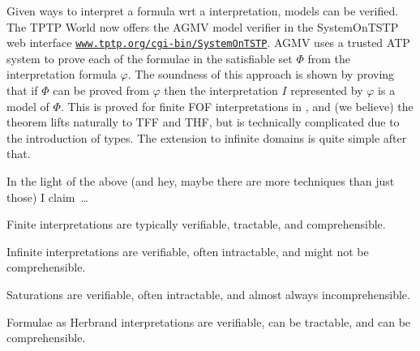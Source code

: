 \documentclass{easychair}
\newenvironment{packed_itemize}{
\vspace*{-0.2em}
\begin{itemize}
\setlength{\partopsep}{0pt}
\setlength{\itemsep}{1pt}
\setlength{\parskip}{0pt}
\setlength{\parsep}{0pt}
}{\end{itemize}}
\begin{document}
Given ways to interpret a formula wrt a interpretation, models can be verified.
The TPTP World now offers the AGMV model verifier in the SystemOnTSTP \cite{Sut07-CSR} web 
interface \href{https://www.tptp.org/cgi-bin/SystemOnTSTP}{{\tt www.tptp.org/cgi-bin/SystemOnTSTP}}.
AGMV uses a trusted ATP system to prove each of the formulae in the satisfiable set $\Phi$
from the interpretation formula $\varphi$.
The soundness of this approach is shown by proving that if $\Phi$ can be proved from $\varphi$ 
then the interpretation $I$ represented by $\varphi$ is a model of $\Phi$.
This is proved for finite FOF interpretations in \cite{SS+23-LPAR}, and (we believe) the theorem 
lifts naturally to TFF and THF, but is technically complicated due to the introduction of types.
The extension to infinite domains is quite simple after that.

In the light of the above (and hey, maybe there are more techniques than just those) I claim~\ldots
\begin{packed_itemize}
\item Finite interpretations are typically verifiable, tractable, and comprehensible.
\item Infinite interpretations are verifiable, often intractable, and might not be 
      comprehensible.
\item Saturations are verifiable, often intractable, and almost always incomprehensible.
\item Formulae as Herbrand interpretations are verifiable, can be tractable, and can be
      comprehensible.
\end{packed_itemize}
\end{document}
